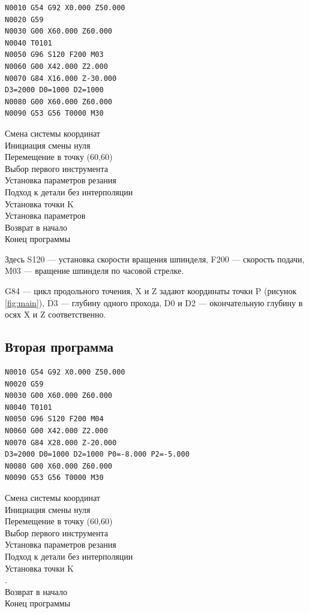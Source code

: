 \begin{minipage}[t]{.45\textwidth}
    \begin{verbatim}
N0010 G54 G92 X0.000 Z50.000
N0020 G59
N0030 G00 X60.000 Z60.000
N0040 T0101
N0050 G96 S120 F200 M03
N0060 G00 X42.000 Z2.000
N0070 G84 X16.000 Z-30.000
D3=2000 D0=1000 D2=1000
N0080 G00 X60.000 Z60.000
N0090 G53 G56 T0000 M30
    \end{verbatim}
\end{minipage}
\begin{minipage}[t]{.45\textwidth}
    \raggedleft
    Смена системы координат\\
    Инициация смены нуля\\
    Перемещение в точку (60,60)\\
    Выбор первого инструмента\\
    Установка параметров резания\\
    Подход к детали без интерполяции\\
    Установка точки K\\
    Установка параметров\\
    Возврат в начало\\
    Конец программы
\end{minipage}

Здесь S120 --- установка скорости вращения шпинделя, F200 --- скорость подачи, M03 --- вращение шпинделя по часовой стрелке.

G84 --- цикл продольного точения, X и Z задают координаты точки P (рисунок \ref{fig:main}), D3 --- глубину одного прохода, D0 и D2 --- окончательную глубину в осях X и Z соответственно.

\subsection*{Вторая программа}

\begin{minipage}[t]{.45\textwidth}
    \begin{verbatim}
N0010 G54 G92 X0.000 Z50.000
N0020 G59
N0030 G00 X60.000 Z60.000
N0040 T0101
N0050 G96 S120 F200 M04
N0060 G00 X42.000 Z2.000
N0070 G84 X28.000 Z-20.000
D3=2000 D0=1000 D2=1000 P0=-8.000 P2=-5.000
N0080 G00 X60.000 Z60.000
N0090 G53 G56 T0000 M30
    \end{verbatim}
\end{minipage}
\begin{minipage}[t]{.45\textwidth}
    \raggedleft
    Смена системы координат\\
    Инициация смены нуля\\
    Перемещение в точку (60,60)\\
    Выбор первого инструмента\\
    Установка параметров резания\\
    Подход к детали без интерполяции\\
    Установка точки K\\
    .\\
    Возврат в начало\\
    Конец программы
\end{minipage}

